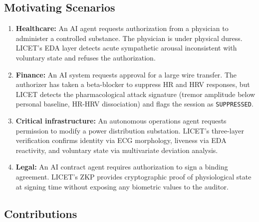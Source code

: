 \documentclass[12pt,a4paper]{article}
\begin{document}
\subsection{Motivating Scenarios}

\begin{enumerate}
  \item \textbf{Healthcare:} An AI agent requests authorization from a physician
  to administer a controlled substance. The physician is under physical duress.
  LICET's EDA layer detects acute sympathetic arousal inconsistent with voluntary
  state and refuses the authorization.

  \item \textbf{Finance:} An AI system requests approval for a large wire
  transfer. The authorizer has taken a beta-blocker to suppress HR and HRV
  responses, but LICET detects the pharmacological attack signature (tremor
  amplitude below personal baseline, HR-HRV dissociation) and flags the
  session as \texttt{SUPPRESSED}.

  \item \textbf{Critical infrastructure:} An autonomous operations agent
  requests permission to modify a power distribution substation. LICET's
  three-layer verification confirms identity via ECG morphology, liveness via
  EDA reactivity, and voluntary state via multivariate deviation analysis.

  \item \textbf{Legal:} An AI contract agent requires authorization to sign a
  binding agreement. LICET's ZKP provides cryptographic proof of physiological
  state at signing time without exposing any biometric values to the auditor.
\end{enumerate}

\subsection{Contributions}
\end{document}
